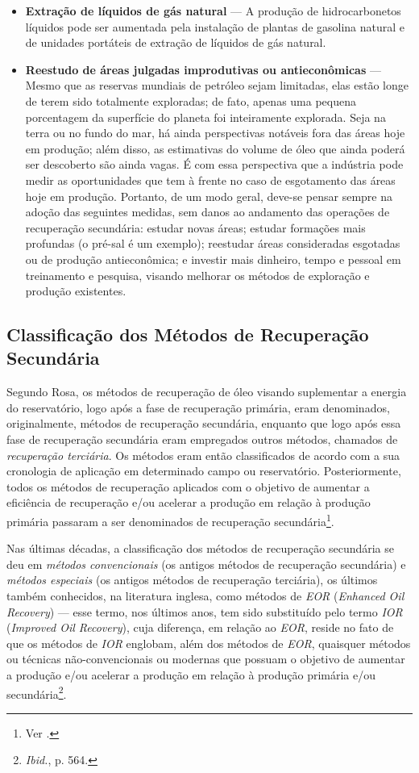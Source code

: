 \begin{itemize}
\item \textbf{Extração de líquidos de gás natural} --- A produção de hidrocarbonetos líquidos pode ser aumentada pela instalação de plantas de gasolina natural e de unidades portáteis de extração de líquidos de gás natural.
\item \textbf{Reestudo de áreas julgadas improdutivas ou antieconômicas} --- Mesmo que as reservas mundiais de petróleo sejam limitadas, elas estão longe de terem sido totalmente exploradas; de fato, apenas uma pequena porcentagem da superfície do planeta foi inteiramente explorada. Seja na terra ou no fundo do mar, há ainda perspectivas notáveis fora das áreas hoje em produção; além disso, as estimativas do volume de óleo que ainda poderá ser descoberto são ainda vagas. É com essa perspectiva que a indústria pode medir as oportunidades que tem à frente no caso de esgotamento das áreas hoje em produção. Portanto, de um modo geral, deve-se pensar sempre na adoção das seguintes medidas, sem danos ao andamento das operações de recuperação secundária: estudar novas áreas; estudar formações mais profundas (o pré-sal é um exemplo); reestudar áreas consideradas esgotadas ou de produção antieconômica; e investir mais dinheiro, tempo e pessoal em treinamento e pesquisa, visando melhorar os métodos de exploração e produção existentes.
\end{itemize}

\subsection{Classificação dos Métodos de Recuperação Secundária}
Segundo Rosa, os métodos de recuperação de óleo visando suplementar a energia do reservatório, logo após a fase de recuperação primária, eram denominados, originalmente, métodos de recuperação secundária, enquanto que logo após essa fase de recuperação secundária eram empregados outros métodos, chamados de \textit{recuperação terciária}. Os métodos eram então classificados de acordo com a sua cronologia de aplicação em determinado campo ou reservatório. Posteriormente, todos os métodos de recuperação aplicados com o objetivo de aumentar a eficiência de recuperação e/ou acelerar a produção em relação à produção primária passaram a ser denominados de recuperação secundária\footnote{Ver \cite[p. 564]{engres}.}.

Nas últimas décadas, a classificação dos métodos de recuperação secundária se deu em \textit{métodos convencionais} (os antigos métodos de recuperação secundária) e \textit{métodos especiais} (os antigos métodos de recuperação terciária), os últimos também conhecidos, na literatura inglesa, como métodos de \textit{EOR} (\textit{Enhanced Oil Recovery}) --- esse termo, nos últimos anos, tem sido substituído pelo termo \textit{IOR} (\textit{Improved Oil Recovery}), cuja diferença, em relação ao \textit{EOR}, reside no fato de que os métodos de \textit{IOR} englobam, além dos métodos de \textit{EOR}, quaisquer métodos ou técnicas não-convencionais ou modernas que possuam o objetivo de aumentar a produção e/ou acelerar a produção em relação à produção primária e/ou secundária\footnote{\textit{Ibid.}, p. 564.}. 

